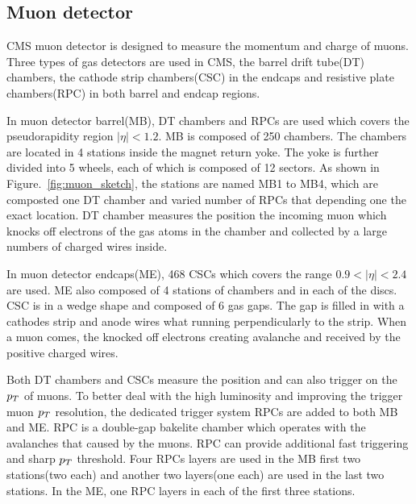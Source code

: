 \subsection{Muon detector}
CMS muon detector is designed to measure the momentum and charge of muons. Three types of gas detectors are used in CMS, the   barrel drift tube(DT) chambers, the cathode strip chambers(CSC) in the endcaps and resistive plate chambers(RPC) in both barrel and endcap regions. 

In muon detector barrel(MB), DT chambers and RPCs are used which covers the pseudorapidity region $|\eta|<1.2$. MB is composed of 250 chambers. The chambers are located in 4 stations inside the magnet return yoke. The yoke is further divided into 5 wheels, each of which is composed of 12 sectors. As shown in Figure.~\ref{fig:muon_sketch}, the stations are named MB1 to MB4, which are composted one DT chamber and varied number of RPCs that depending one the exact location. DT chamber measures the position the incoming muon which knocks off electrons of the gas atoms in the chamber and collected by a large numbers of charged wires inside.%

In muon detector endcaps(ME), 468 CSCs which covers the range $0.9<|\eta|<2.4$ are used. ME also composed of 4 stations of chambers and in each of the discs. CSC is in a wedge shape and composed of 6 gas gaps. The gap is filled in with a cathodes strip and anode wires what running perpendicularly to the strip. When a muon comes, the knocked off electrons creating avalanche and received by the positive charged wires.  

Both DT chambers and CSCs measure the position and can also trigger on the $p_{T}$ of muons. To better deal with the high luminosity and improving the trigger muon $p_{T}$ resolution, the dedicated trigger system RPCs are added to both MB and ME. RPC is a double-gap bakelite chamber which operates with the avalanches that caused by the muons. RPC can provide additional fast triggering and sharp $p_{T}$ threshold. Four RPCs layers are used in the MB first two stations(two each) and another two layers(one each) are used in the last two stations.  In the ME, one RPC layers in each of the first three stations.    



